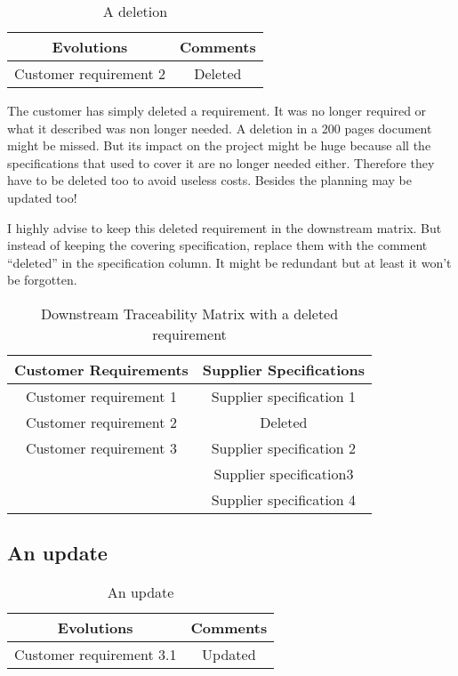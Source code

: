 \begin{table*}
	\centering
		\begin{tabular}{|c|c|}
			\hline
			\textbf{Evolutions} & \textbf{Comments}\\
            \hline
            Customer requirement 2 & Deleted\\
            \hline
		\end{tabular}
	\caption{A deletion}
	\label{tab:Deletion}
\end{table*}

The customer has simply deleted a requirement. It was no longer required or what it described was non longer needed. A deletion in a 200 pages document might be missed. But its impact on the project might be huge because all the specifications that used to cover it are no longer needed either. Therefore they have to be deleted too to avoid useless costs. Besides the planning may be updated too!

I highly advise to keep this deleted requirement in the downstream matrix. But instead of keeping the covering specification, replace them with the comment “deleted” in the specification column. It might be redundant but at least it won’t be forgotten.

\begin{table*}
	\centering
		\begin{tabular}{|c|c|}
			\hline
			\textbf{Customer Requirements} & \textbf{Supplier Specifications}\\
            \hline
            Customer requirement 1 & Supplier specification 1\\
            \hline
            Customer requirement 2 & Deleted\\
            \hline
            Customer requirement 3 & Supplier specification 2\\
            &Supplier specification3\\
            &Supplier specification 4\\
            \hline
		\end{tabular}
	\caption{Downstream Traceability Matrix with a deleted requirement}
	\label{tab:DownstreamTraceabilityMatrixWithDeletedReq}
\end{table*}

\subsection{An update}

\begin{table}
	\centering
		\begin{tabular}{|c|c|}
			\hline
			\textbf{Evolutions} & \textbf{Comments}\\
            \hline
            Customer requirement 3.1 & Updated\\
            \hline
		\end{tabular}
	\caption{An update}
	\label{tab:Update}
\end{table}

